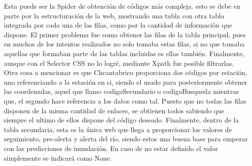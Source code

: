Esta puede ser la Spider de obtención de códigos más compleja. esto se debe en parte por la estructuración de la web, mostrando una tabla con otra tabla integrada por cada una de las filas, como por la cantidad de información que dispone.\newline
\newline
El primer problema fue como obtener las filas de la tabla principal, pues en muchos de los intentos realizados no solo tomaba estas filas, si no que tomaba aquellas que formaban parte de las tablas incluidas es ellas también. Finalmente, aunque con el Selector CSS no lo logré, mediante Xpath fue posible filtrarlas.\newline
\newline
Otra cosa a mencionar es que Chcantabrico proporciona dos códigos por estación, uno referenciando a la estación en si, siendo el usado para posteriormente obtener las coordenadas, aquel que llamo codigoSecundario o codigoBusqueda mientras que, el segundo hace referencia a los datos como tal. Puesto que no todas las filas disponen de la misma cantidad de enlaces, se obtienen todos sabiendo que siempre el ultimo de ellos dispone del código deseado.\newline
\newline
Finalmente, dentro de la tabla secundaria, esta es la única web que llega a proporcionar los valores de seguimiento, pre-alerta y alerta del río, siendo estos una buena base para empezar con las predicciones de inundación. En caso de no estar definido el valor simplemente se indicará como None.

